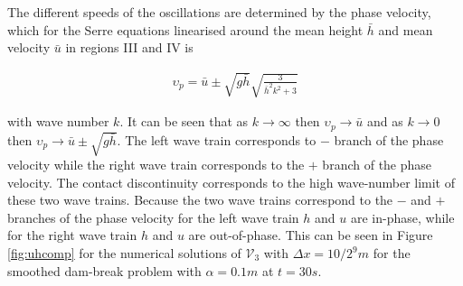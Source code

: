 \documentclass[times]{elsarticle}
\begin{document}
The different speeds of the oscillations are determined by the phase velocity, which for the Serre equations linearised around the mean height $\bar{h}$ and mean velocity $\bar{u}$ in regions III and IV is
\begin{linenomath*}
	\begin{gather}
	\upsilon_p = \bar{u} \pm \sqrt{g\bar{h}} \sqrt{\frac{3}{\bar{h}^2 k^2 + 3}}
	\label{eq:cd}
	\end{gather}
\end{linenomath*}
with wave number $k$. It can be seen that as $k \rightarrow \infty$ then $\upsilon_p \rightarrow \bar{u}$ and as $k \rightarrow 0$ then $\upsilon_p \rightarrow \bar{u} \pm \sqrt{g\bar{h}}$. The left wave train corresponds to $-$ branch of the phase velocity while the right wave train corresponds to the $+$ branch of the phase velocity. The contact discontinuity corresponds to the high wave-number limit of these two wave trains. Because the two wave trains correspond to the $-$ and $+$ branches of the phase velocity for the left wave train $h$ and $u$ are in-phase, while for the right wave train $h$ and $u$ are out-of-phase. This can be seen in Figure \ref{fig:uhcomp} for the numerical solutions of $\mathcal{V}_3$ with $\Delta x = 10/2^{9}m$ for the smoothed dam-break problem with $\alpha = 0.1m$ at $t=30s$.
\end{document}

